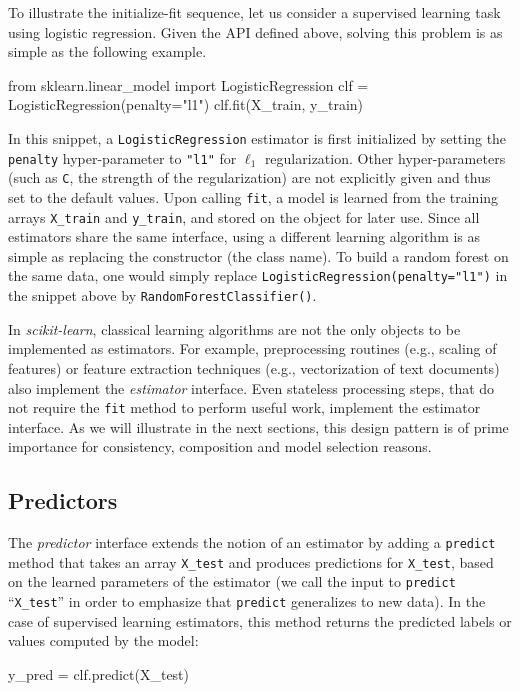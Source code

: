 \documentclass[twocolumn]{article}
\newcommand{\sklearn}{\textit{scikit-learn}\xspace}
\begin{document}
To illustrate the initialize-fit sequence,
let us consider a supervised learning task using logistic regression.
Given the API defined above, solving this problem is as simple as the following
example.
\begin{footnotesize}
\begin{pythoncode}
from sklearn.linear_model import LogisticRegression
clf = LogisticRegression(penalty="l1")
clf.fit(X_train, y_train)
\end{pythoncode}
\end{footnotesize}
In this snippet, a \texttt{LogisticRegression} estimator is first initialized by
setting the \texttt{penalty} hyper-parameter to \texttt{"l1"} for
$\ell_1$ regularization. Other hyper-parameters (such as \texttt{C},
the strength of the regularization) are not explicitly given and
thus set to the default values. Upon calling \texttt{fit}, a model is
learned from the training arrays \texttt{X\_train} and \texttt{y\_train},
and stored on the object for later use.
Since all estimators share the same interface, using a different learning algorithm is
as simple as replacing the constructor (the class name).
To build a random forest on
the same data, one would simply replace
\texttt{LogisticRegression(penalty="l1")} in the snippet above by
\texttt{RandomForestClassifier()}.

In \sklearn, classical learning algorithms are not the only objects to be
implemented as estimators. For example, preprocessing routines (e.g., scaling of
features) or feature extraction techniques (e.g., vectorization of text
documents) also implement the \textit{estimator} interface. Even stateless
processing steps, that do not require the \texttt{fit} method to
perform useful work, implement the estimator interface. As we will illustrate
in the next sections, this design pattern is of prime importance for
consistency, composition and model selection reasons.

\subsection{Predictors}

The \textit{predictor} interface extends the notion of an estimator
by adding a \texttt{predict}
method that takes an array \texttt{X\_test} and produces
predictions for \texttt{X\_test}, based on the learned parameters of the
estimator (we call the input to \texttt{predict} ``\texttt{X\_test}'' in order
to emphasize that \texttt{predict} generalizes to new data). In the case of
supervised learning estimators, this method returns the predicted
labels or values computed by the model:
\begin{pythoncode}
y_pred = clf.predict(X_test)
\end{pythoncode}
\end{document}
